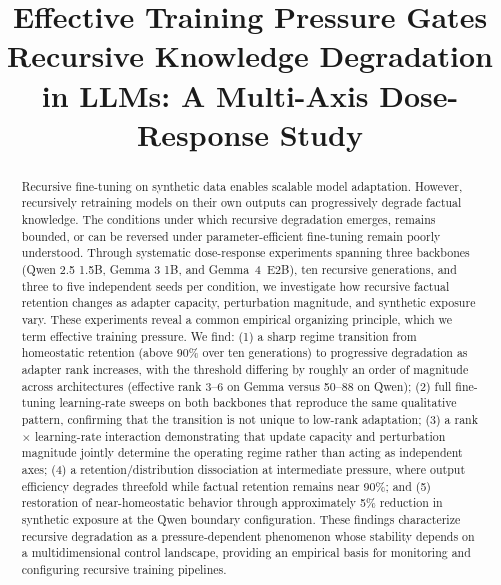 \documentclass[a4paper,fleqn]{cas-dc}
\begin{document}
\let\WriteBookmarks\relax
\def\floatpagefraction{.8}
\def\textfraction{.1}
\def\topfraction{.9}
\def\bottomfraction{.9}
\setcounter{topnumber}{4}
\setcounter{bottomnumber}{4}
\setcounter{totalnumber}{8}

\setlength{\textfloatsep}{4pt plus 1pt minus 1pt}
\setlength{\floatsep}{4pt plus 1pt minus 1pt}
\setlength{\intextsep}{4pt plus 1pt minus 1pt}
\setlength{\dbltextfloatsep}{4pt plus 1pt minus 1pt}
\setlength{\dblfloatsep}{4pt plus 1pt minus 1pt}
\setlength{\abovecaptionskip}{2pt}
\setlength{\belowcaptionskip}{0pt}


\title[mode=title]{Effective Training Pressure Gates Recursive Knowledge
  Degradation in LLMs: A Multi-Axis Dose-Response Study}








\begin{abstract}
Recursive fine-tuning on synthetic data enables scalable model adaptation.
However, recursively retraining models on their own outputs can progressively
degrade factual knowledge. The conditions under which recursive degradation
emerges, remains bounded, or can be reversed under parameter-efficient
fine-tuning remain poorly understood. Through systematic dose-response experiments spanning three backbones
(Qwen 2.5 1.5B, Gemma 3 1B, and Gemma~4~E2B), ten recursive generations,
and three to five independent seeds per condition, we investigate how recursive
factual retention changes as adapter capacity, perturbation magnitude, and
synthetic exposure vary. These experiments reveal a common empirical organizing
principle, which we term effective training pressure. We find: (1) a sharp
regime transition from homeostatic retention (above 90\% over ten generations)
to progressive degradation as adapter rank increases, with the threshold
differing by roughly an order of magnitude across architectures
(effective rank 3--6 on Gemma versus 50--88 on Qwen); (2) full fine-tuning
learning-rate sweeps on both backbones that reproduce the same qualitative
pattern, confirming that the transition is not unique to low-rank adaptation;
(3) a rank $\times$ learning-rate interaction demonstrating that update capacity
and perturbation magnitude jointly determine the operating regime rather than
acting as independent axes; (4) a retention/distribution dissociation at
intermediate pressure, where output efficiency degrades threefold while factual
retention remains near 90\%; and (5) restoration of near-homeostatic behavior
through approximately 5\% reduction in synthetic exposure at the Qwen boundary
configuration. These findings characterize recursive degradation as a
pressure-dependent phenomenon whose stability depends on a multidimensional
control landscape, providing an empirical basis for monitoring and configuring
recursive training pipelines.
\end{abstract}
\end{document}
